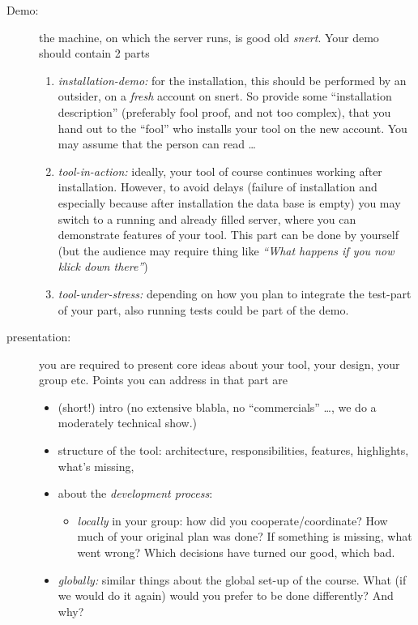 \begin{description}
\item[Demo:] the machine, on which the server runs, is good old
  \emph{snert}. Your demo should contain 2 parts
  \begin{enumerate}
  \item \emph{installation-demo:} for the installation, this should be
    performed by an outsider, on a \emph{fresh} account on snert. So
    provide some ``installation description'' (preferably fool proof, and
    not too complex), that you hand out to the ``fool'' who installs your
    tool on the new account. You may assume that the person can read \ldots
  \item \emph{tool-in-action:} ideally, your tool of course continues
    working after installation. However, to avoid delays (failure of
    installation and especially because after installation the data base is
    empty) you may switch to a running and already filled server, where you
    can demonstrate features of your tool. This part can be done by yourself
    (but the audience may require thing like \emph{``What happens if you
      now klick down there''})
  \item \emph{tool-under-stress:} depending on how you plan to integrate
    the test-part of your part, also running tests could be part of the
    demo.
  \end{enumerate}
\item[presentation:] you are required to present core ideas about your
  tool, your design, your group etc. Points you can address in that part are
  \begin{itemize}
  \item (short!) intro (no extensive blabla, no ``commercials'' \ldots, we
    do a moderately technical show.)
  \item structure of the tool: architecture, responsibilities, features,
    highlights, what's missing,
  \item about the \emph{development process}:
    \begin{itemize}
    \item \emph{locally} in your group: how did you cooperate/coordinate?
      How much of your original plan was done? If something is missing,
      what went wrong? Which decisions have turned our good, which bad.
    \end{itemize}
  \item \emph{globally:} similar things about the global set-up of the
    course. What (if we would do it again) would you prefer to be done
    differently? And why?
  \end{itemize}
\end{description}

